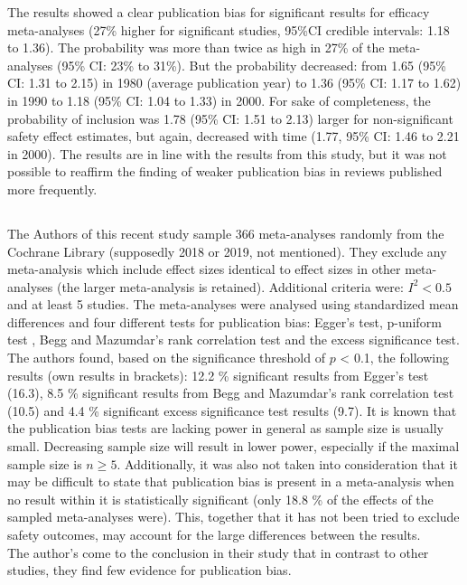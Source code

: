 \documentclass[11pt,a4paper,twoside]{book}\usepackage[]{graphicx}\usepackage[]{color}
\begin{document}
The results showed a clear publication bias for significant results for efficacy meta-analyses (27\% higher for significant studies, 95\%CI credible intervals: 1.18 to 1.36). The probability was more than twice as high in 27\% of the meta-analyses (95\% CI: 23\% to 31\%). But the probability decreased: from 1.65 (95\% CI: 1.31 to 2.15) in 1980 (average publication year) to 1.36 (95\% CI: 1.17 to 1.62) in 1990 to 1.18 (95\% CI: 1.04 to 1.33) in 2000. For sake of completeness, the probability of inclusion was  1.78 (95\% CI: 1.51 to 2.13) larger for non-significant safety effect estimates, but again, decreased with time (1.77, 95\% CI: 1.46 to 2.21 in 2000). The results are in line with the results from this study, but it was not possible to reaffirm the finding of weaker publication bias in reviews published more frequently.\\

\subsection{\citealp{vanAert.2019}}
The Authors of this recent study sample 366 meta-analyses randomly from the Cochrane Library (supposedly 2018 or 2019, not mentioned). They exclude any meta-analysis which include effect sizes identical to effect sizes in other meta-analyses (the larger meta-analysis is retained). Additional criteria were: $I^2 < 0.5$ and at least 5 studies. The meta-analyses were analysed using standardized mean differences and four different tests for publication bias: Egger's test, p-uniform test \citep{p.uniform}, Begg and Mazumdar's rank correlation test and the excess significance test. \\
The authors found, based on the significance threshold of $p$ < 0.1, the following results (own results in brackets):
12.2 \% significant results from Egger's test (16.3),
8.5 \% significant results from Begg and Mazumdar's rank correlation test (10.5) and
4.4 \% significant excess significance test results (9.7).
It is known that the publication bias tests are lacking power in general as sample size is usually small. Decreasing sample size will result in lower power, especially if the maximal sample size is $n \geq 5$. Additionally, it was also not taken into consideration that it may be difficult to state that publication bias is present in a meta-analysis when no result within it is statistically significant (only 18.8 \% of the effects of the sampled meta-analyses were). This, together that it has not been tried to exclude safety outcomes, may account for the large differences between the results. \\
The author's come to the conclusion in their study that in contrast to other studies, they find few evidence for publication bias.
\end{document}
